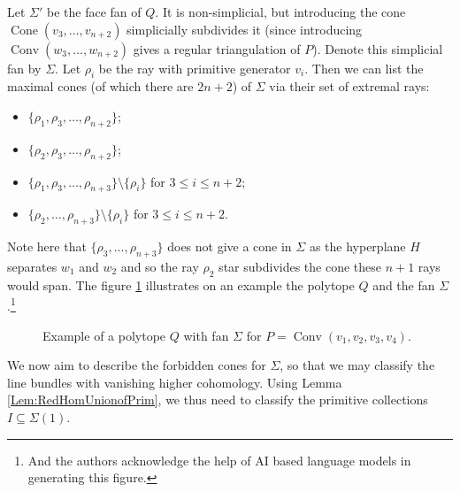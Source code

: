 \documentclass[reqno, 12pt]{amsart}
\theoremstyle{definition}
\numberwithin{equation}{section}
\newcommand{\cone}{\operatorname{Cone}}
\newcommand{\conv}{\operatorname{Conv}}
\begin{document}
Let $\Sigma'$ be the face fan of $Q$. It is non-simplicial, but introducing the cone $\cone(v_3,\dots,v_{n+2})$ simplicially subdivides it (since introducing $\conv(w_3,\dots,w_{n+2})$ gives a regular triangulation of $P$). Denote this simplicial fan by $\Sigma$. Let $\rho_i$ be the ray with primitive generator $v_i$. Then we can list the maximal cones (of which there are $2n+2$) of $\Sigma$ via their set of extremal rays: \begin{itemize}
    \item $\{\rho_1,\rho_3,\dots,\rho_{n+2}\}$;
    \item $\{\rho_2,\rho_3,\dots,\rho_{n+2}\}$;
    \item $\{\rho_1,\rho_3,\dots,\rho_{n+3}\}\setminus\{\rho_i\}$ for $3\le i\le n+2$;
    \item $\{\rho_2,\dots,\rho_{n+3}\}\setminus \{\rho_i\}$ for $3\le i\le n+2$.
\end{itemize}
Note here that $\{\rho_3,\dots,\rho_{n+3}\}$ does not give a cone in $\Sigma$ as the hyperplane $H$ separates $w_1$ and $w_2$ and so the ray $\rho_2$ star subdivides the cone these  $n+1$ rays would span. The figure \ref{fig:Q} illustrates on an example the polytope $Q$ and the fan $\Sigma$.\footnote{And the authors acknowledge the help of AI based language models in generating this figure.}

\begin{figure}[ht!]
\caption{Example of a polytope $Q$ with fan $\Sigma$ for $P=\conv(v_1,v_2,v_3,v_4)$.}
\label{fig:Q}
\end{figure}

We now aim to describe the forbidden cones for $\Sigma$, so that we may classify the line bundles with vanishing higher cohomology. Using Lemma \ref{Lem:RedHomUnionofPrim}, we thus need to classify the primitive collections $I\subseteq \Sigma(1)$.
\end{document}
